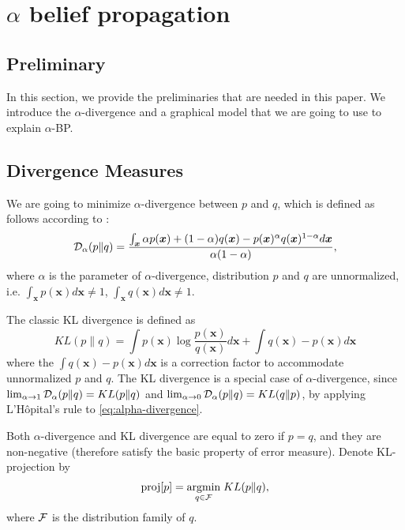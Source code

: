 \documentclass{article}
\begin{document}
\section{$\alpha$ belief propagation}\label{sec:alphabp}
\subsection{Preliminary}\label{sec:preliminary}
In this section, we provide the preliminaries that are needed in this paper. We introduce the $\alpha$-divergence and a graphical model that we are going to use to explain $\alpha$-BP.

\subsection{Divergence Measures}
We are going to minimize $\alpha$-divergence between $p$ and $q$, which is defined as follows according to \cite{Zhu95informationgeometric}\cite{divergence-measures-and-message-passing}: \\
\begin{equation}\label{eq:alpha-divergence}
  \mathcal{D}_{\alpha}(p \| q ) = \frac{\int_{\bm{x}} \alpha p(\bm{x}) + (1-\alpha) q (\bm{x}) - p(\bm{x})^{\alpha} q(\bm{x})^{1-\alpha} d\bm{x}}{\alpha(1-\alpha)},
\end{equation}
where $\alpha$ is the parameter of $\alpha$-divergence, distribution $p$ and $q$ are unnormalized, i.e. $\int_{\bm{x}}p(\bm{x}) d\bm{x} \neq 1$, $\int_{\bm{x}}q(\bm{x}) d\bm{x} \neq 1$.

The classic KL divergence is defined as
\begin{equation}
  KL(p \| q) = \int p(\bm{x}) \log{\frac{p(\bm{x})}{q(\bm{x})}} d \bm{x}+ \int q(\bm{x}) - p(\bm{x}) d\bm{x}
\end{equation}
where the $\int q(\bm{x}) - p(\bm{x}) d\bm{x}$ is a correction factor to accommodate unnormalized $p$ and $q$. The KL divergence is a special case of $\alpha$-divergence, since $\lim_{\alpha \rightarrow 1}\mathcal{D}_{\alpha}(p \| q ) = KL(p\|q)$ and $\lim_{\alpha \rightarrow 0}\mathcal{D}_{\alpha}(p \| q ) = KL(q\|p)$, by applying L'H\^opital's rule to \autoref{eq:alpha-divergence}.

Both $\alpha$-divergence and KL divergence are equal to zero if $p=q$, and they are non-negative (therefore satisfy the basic property of error measure).
Denote KL-projection by
\begin{equation}
  \text{proj}[p] = \underset{q \in \mathcal{F}}{\operatorname{argmin}}\; KL(p\|q),
\end{equation}
where $\mathcal{F}$ is the distribution family of $q$.
\end{document}
